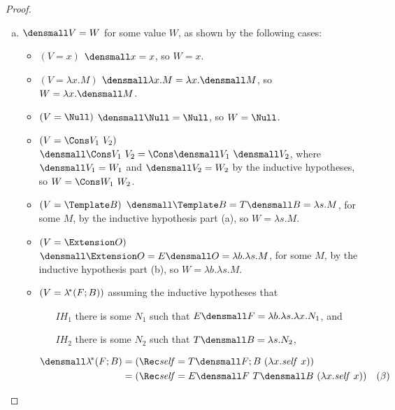 \begin{proof}
\begin{enumerate}[(a)]
\begin{itemize}
    \end{itemize}
  \item $\den{V} = W$ for some value $W$, as shown by the following cases:
    \begin{itemize}
    \item $(V = x)$
      $\den{x} = x$, so $W=x$.
    \item $(V = \lambda x. M)$
      $\den{\lambda x. M} = \lambda x. \den{M}$, so $W = \lambda x. \den{M}$.
    \item $(V = \Null)$
      $\den{\Null} = \Null$, so $W=\Null$.
    \item $(V = \Cons V_1 ~ V_2)$
      $\den{\Cons V_1 ~ V_2} = \Cons \den{V_1} ~ \den{V_2}$,
      where $\den{V_1} = W_1$ and $\den{V_2} = W_2$ by the inductive hypotheses,
      so $W = \Cons W_1 ~ W_2$.
    \item $(V = \Template B)$
      $\den{\Template B} = T\den{B} = \lambda s. M$, for some $M$,
      by the inductive hypothesis part (a),
      so $W = \lambda s. M$.
    \item $(V = \Extension O)$
      $\den{\Extension O} = E\den{O} = \lambda b. \lambda s. M$, for some $M$,
      by the inductive hypothesis part (b),
      so $W = \lambda b. \lambda s. M$.
    \item $(V = \lambda^{\!*} (F; B))$
      assuming the inductive hypotheses that 
      \begin{itemize}
      \item[$IH_1$] there is some $N_1$ such that
        $E\den{F} = \lambda b. \lambda s. \lambda x. N_1$, and
      \item[$IH_2$] there is some $N_2$ such that
        $T\den{B} = \lambda s. N_2$,
      \end{itemize}
      \begin{align*}
        \den{\lamstar (F; B)}
        &=
        (\Rec \mathit{self} = T\den{F; B} ~ (\lambda x. \mathit{self} ~ x))
        \\
        &=
        (\Rec \mathit{self} = E\den{F} ~ T\den{B} ~ (\lambda x. \mathit{self} ~ x))
        &(\beta)
        \\

\end{align*}
\end{itemize}
\end{enumerate}
\end{proof}
